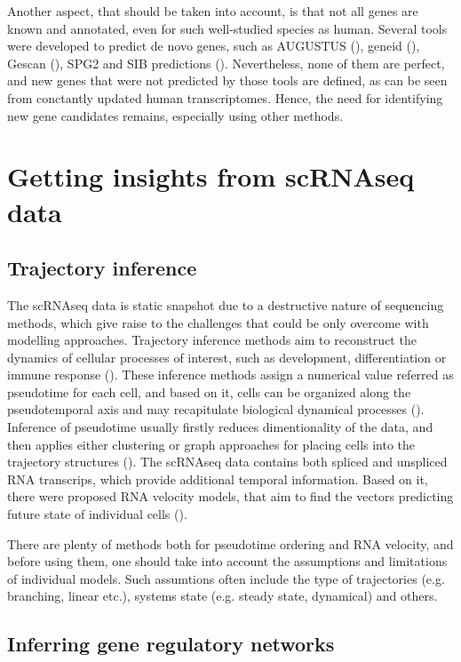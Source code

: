 Another aspect, that should be taken into account, is that not all genes are known and annotated, even for such well-studied species as human.
Several tools were developed to predict de novo genes, such as AUGUSTUS (\cite{Stanke2008}), geneid (\cite{Blanco2007}), Gescan (\cite{Burge1997}),
SPG2 and SIB predictions (\cite{Prediction}).
Nevertheless, none of them are perfect, and new genes that were not predicted by those tools are defined,
as can be seen from conctantly updated human transcriptomes.
Hence, the need for identifying new gene candidates remains, especially using other methods.

\section{Getting insights from scRNAseq data}

\subsection{Trajectory inference}

The scRNAseq data is static snapshot due to a destructive nature of sequencing methods,
which give raise to the challenges that could be only overcome with modelling approaches.
Trajectory inference methods aim to reconstruct the dynamics of cellular processes of interest,
such as development, differentiation or immune response (\cite{Deconinck2021}).
These inference methods assign a numerical value referred as pseudotime for each cell, and based on it,
cells can be organized along the pseudotemporal axis and may recapitulate biological dynamical processes (\cite{Wang2021}).
Inference of pseudotime usually firstly reduces dimentionality of the data, and then applies either clustering or graph approaches
for placing cells into the trajectory structures (\cite{Deconinck2021}).
The scRNAseq data contains both spliced and unspliced RNA transcrips, which provide additional temporal information.
Based on it, there were proposed RNA velocity models, that aim to find the vectors predicting future state of individual cells (\cite{Manno2018}).

There are plenty of methods both for pseudotime ordering and RNA velocity, and before using them,
one should take into account the assumptions and limitations of individual models.
Such assumtions often include the type of trajectories (e.g. branching, linear etc.), systems state (e.g. steady state, dynamical) and others.

\subsection{Inferring gene regulatory networks}

